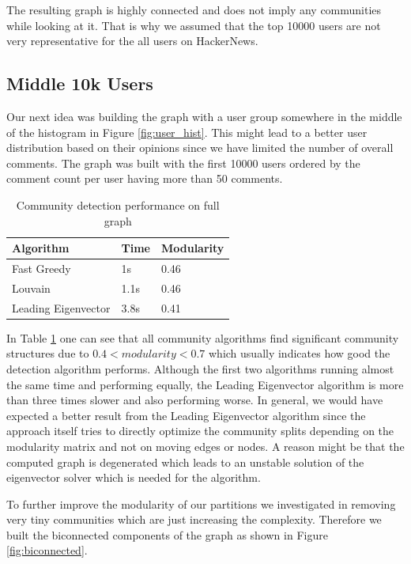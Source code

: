\documentclass[sigconf]{acmart}
\begin{document}
The resulting graph is highly connected and does not imply any communities while looking at it. That is why we assumed that the top 10000 users are not very representative for the all users on HackerNews. 

\subsection{Middle 10k Users}

Our next idea was building the graph with a user group somewhere in the middle of the histogram in Figure \ref{fig:user_hist}.
This might lead to a better user distribution based on their opinions since we have limited the number of overall comments.
The graph was built with the first 10000 users ordered by the comment count per user having more than 50 comments. 

\begin{table}[h]
\centering
\begin{tabular}{l|l|l}
Algorithm           & Time & Modularity \\ \hline
Fast Greedy         & 1s   & 0.46       \\ \hline
Louvain             & 1.1s & 0.46       \\ \hline
Leading Eigenvector & 3.8s & 0.41      
\end{tabular}
\caption{Community detection performance on full graph}
\label{full_comm}
\end{table}

In Table \ref{full_comm} one can see that all community algorithms find significant community structures due to $0.4 < modularity < 0.7$ which usually indicates how good the detection algorithm performs.
Although the first two algorithms running almost the same time and performing equally, the Leading Eigenvector algorithm is more than three times slower and also performing worse.
In general, we would have expected a better result from the Leading Eigenvector algorithm since the approach itself tries to directly optimize the community splits depending on the modularity matrix and not on moving edges or nodes.
A reason might be that the computed graph is degenerated which leads to an unstable solution of the eigenvector solver which is needed for the algorithm.

To further improve the modularity of our partitions we investigated in removing very tiny communities which are just increasing the complexity.
Therefore we built the biconnected components of the graph as shown in Figure \ref{fig:biconnected}.
\end{document}
